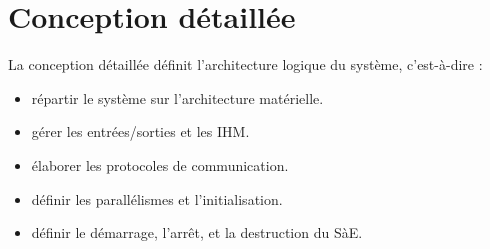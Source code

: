\section{Conception détaillée}

La conception détaillée définit l'architecture logique du système, c'est-à-dire :

\begin{itemize}
    \item répartir le système sur l'architecture matérielle.
    \item gérer les entrées/sorties et les IHM.
    \item élaborer les protocoles de communication.
    \item définir les parallélismes et l'initialisation.
    \item définir le démarrage, l'arrêt, et la destruction du SàE.
\end{itemize}


\newpage 


\newpage 


\newpage 



